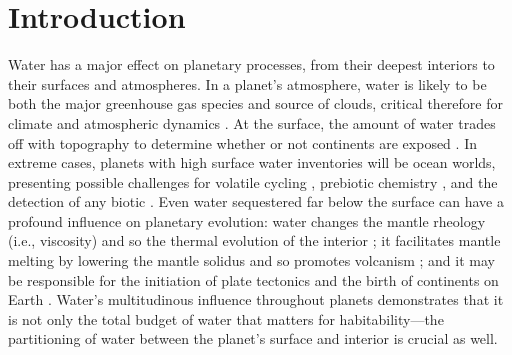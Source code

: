 \section{Introduction}

Water has a major effect on planetary processes, from their deepest interiors to their surfaces and atmospheres. In a planet's atmosphere, water is likely to be both the major greenhouse gas species and source of clouds, critical therefore for climate and atmospheric dynamics \citep[e.g.,][]{pierrehumbert_thermostats_1995,frierson_grayradiation_2006,frierson_grayradiation_2007}. At the surface, the amount of water trades off with topography to determine whether or not continents are exposed \citep{cowan_water_2014, honing_continental_2016, guimond_blue_2022}. In extreme cases, planets with high surface water inventories will be ocean worlds, presenting possible challenges for volatile cycling \citep{kitzmann_unstable_2015, noack_waterrich_2016, nakayama_runaway_2019, honing_carbon_2019, krissansen-totton_waterworlds_2021}, prebiotic chemistry \citep{patel_common_2015, rimmer_origin_2018}, and the detection of any biotic  \citep{glaser_detectability_2020, krissansen-totton_oxygen_2021}. Even water sequestered far below the surface can have a profound influence on planetary evolution: water changes the mantle rheology (i.e., viscosity) and so the thermal evolution of the interior \citep{karato_rheology_1993, seales_deep_2020}; it facilitates mantle melting by lowering the mantle solidus and so promotes volcanism \citep{green_experimental_1973, katz_new_2003}; and it may be responsible for the initiation of plate tectonics and the birth of continents on Earth \citep{korenaga_initiation_2013}. Water's multitudinous influence throughout planets demonstrates that it is not only the total budget of water that matters for habitability---the partitioning of water between the planet's surface and interior is crucial as well.

